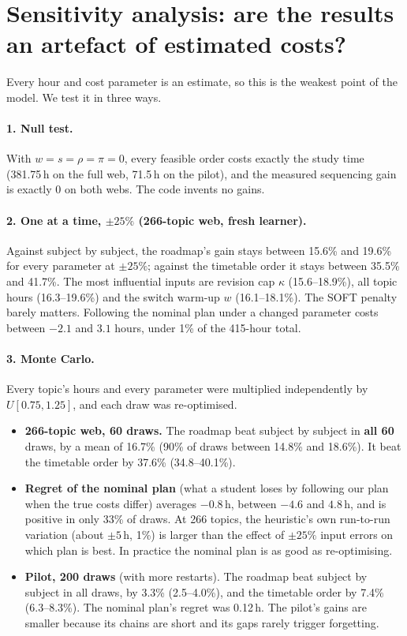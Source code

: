 \documentclass[11pt,a4paper]{article}
\begin{document}
\section{Sensitivity analysis: are the results an artefact of estimated costs?}
\label{sec:sens}
Every hour and cost parameter is an estimate, so this is the weakest point of the model. We test it in three ways.

\paragraph{1. Null test.} With $w=s=\rho=\pi=0$, every feasible order costs exactly the study time (381.75\,h on the full web, 71.5\,h on the pilot), and the measured sequencing gain is exactly 0 on both webs. The code invents no gains.

\paragraph{2. One at a time, $\pm25\%$ (266-topic web, fresh learner).} Against subject by subject, the roadmap's gain stays between 15.6\% and 19.6\% for every parameter at $\pm25\%$; against the timetable order it stays between 35.5\% and 41.7\%. The most influential inputs are revision cap $\kappa$ (15.6--18.9\%), all topic hours (16.3--19.6\%) and the switch warm-up $w$ (16.1--18.1\%). The SOFT penalty barely matters. Following the nominal plan under a changed parameter costs between $-2.1$ and $3.1$ hours, under 1\% of the 415-hour total.

\paragraph{3. Monte Carlo.} Every topic's hours and every parameter were multiplied independently by $U[0.75,1.25]$, and each draw was re-optimised.
\begin{itemize}
\item \textbf{266-topic web, 60 draws.} The roadmap beat subject by subject in \textbf{all 60} draws, by a mean of 16.7\% (90\% of draws between 14.8\% and 18.6\%). It beat the timetable order by 37.6\% (34.8--40.1\%).
\item \textbf{Regret of the nominal plan} (what a student loses by following our plan when the true costs differ) averages $-0.8$\,h, between $-4.6$ and $4.8$\,h, and is positive in only 33\% of draws. At 266 topics, the heuristic's own run-to-run variation (about $\pm5$\,h, 1\%) is larger than the effect of $\pm25\%$ input errors on which plan is best. In practice the nominal plan is as good as re-optimising.
\item \textbf{Pilot, 200 draws} (with more restarts). The roadmap beat subject by subject in all draws, by 3.3\% (2.5--4.0\%), and the timetable order by 7.4\% (6.3--8.3\%). The nominal plan's regret was 0.12\,h. The pilot's gains are smaller because its chains are short and its gaps rarely trigger forgetting.
\end{itemize}
\end{document}
